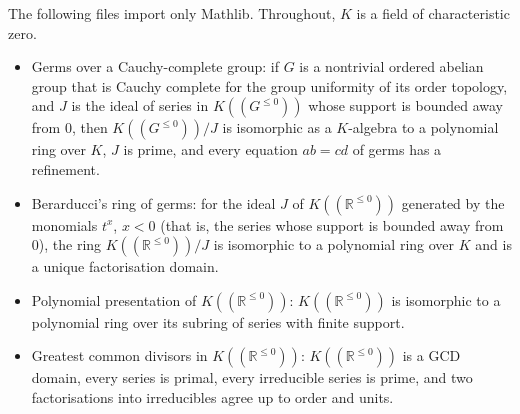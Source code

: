 The following files import only Mathlib.  Throughout, $K$ is a field of characteristic zero.
\begin{itemize}
  \item {}
    {Germs over a Cauchy-complete group}: if $G$ is a nontrivial ordered abelian group that is
    Cauchy complete for the group uniformity of its order topology, and $J$ is the ideal of
    series in $K((G^{\le0}))$ whose support is bounded away from $0$, then $K((G^{\le0}))/J$ is
    isomorphic as a $K$-algebra to a polynomial ring over $K$, $J$ is prime, and every equation
    $ab=cd$ of germs has a refinement.
  \item {}
    {Berarducci's ring of germs}: for the ideal $J$ of $K((\mathbb R^{\le0}))$ generated by
    the monomials $t^x$, $x<0$ (that is, the series whose support is bounded away from $0$), the
    ring $K((\mathbb R^{\le0}))/J$ is isomorphic to a polynomial
    ring over $K$ and is a unique factorisation domain.
  \item {}
    {Polynomial presentation of $K((\mathbb R^{\le0}))$}: $K((\mathbb R^{\le0}))$ is
    isomorphic to a polynomial ring over its subring of series with finite support.
  \item {}
    {Greatest common divisors in $K((\mathbb R^{\le0}))$}: $K((\mathbb R^{\le0}))$ is a GCD
    domain, every series is primal, every irreducible series is prime, and two factorisations
    into irreducibles agree up to order and units.
\end{itemize}

\clearpage
